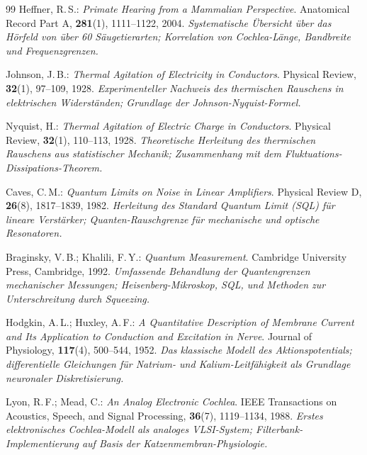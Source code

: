 ﻿\documentclass[12pt,a4paper,titlepage]{report}
\begin{document}
\begin{thebibliography}{99}
Heffner, R.\,S.:
\textit{Primate Hearing from a Mammalian Perspective}.
Anatomical Record Part A, \textbf{281}(1), 1111--1122, 2004.
\newline\textit{Systematische Übersicht über das Hörfeld von über 60
Säugetierarten; Korrelation von Cochlea-Länge, Bandbreite und Frequenzgrenzen.}

Johnson, J.\,B.:
\textit{Thermal Agitation of Electricity in Conductors}.
Physical Review, \textbf{32}(1), 97--109, 1928.
\newline\textit{Experimenteller Nachweis des thermischen Rauschens in elektrischen
Widerständen; Grundlage der Johnson-Nyquist-Formel.}

Nyquist, H.:
\textit{Thermal Agitation of Electric Charge in Conductors}.
Physical Review, \textbf{32}(1), 110--113, 1928.
\newline\textit{Theoretische Herleitung des thermischen Rauschens aus statistischer
Mechanik; Zusammenhang mit dem Fluktuations-Dissipations-Theorem.}

Caves, C.\,M.:
\textit{Quantum Limits on Noise in Linear Amplifiers}.
Physical Review D, \textbf{26}(8), 1817--1839, 1982.
\newline\textit{Herleitung des Standard Quantum Limit (SQL) für lineare Verstärker;
Quanten-Rauschgrenze für mechanische und optische Resonatoren.}

Braginsky, V.\,B.; Khalili, F.\,Y.:
\textit{Quantum Measurement}.
Cambridge University Press, Cambridge, 1992.
\newline\textit{Umfassende Behandlung der Quantengrenzen mechanischer Messungen;
Heisenberg-Mikroskop, SQL, und Methoden zur Unterschreitung durch Squeezing.}

Hodgkin, A.\,L.; Huxley, A.\,F.:
\textit{A Quantitative Description of Membrane Current and Its Application to
Conduction and Excitation in Nerve}.
Journal of Physiology, \textbf{117}(4), 500--544, 1952.
\newline\textit{Das klassische Modell des Aktionspotentials; differentielle
Gleichungen für Natrium- und Kalium-Leitfähigkeit als Grundlage neuronaler
Diskretisierung.}

Lyon, R.\,F.; Mead, C.:
\textit{An Analog Electronic Cochlea}.
IEEE Transactions on Acoustics, Speech, and Signal Processing,
\textbf{36}(7), 1119--1134, 1988.
\newline\textit{Erstes elektronisches Cochlea-Modell als analoges VLSI-System;
Filterbank-Implementierung auf Basis der Katzenmembran-Physiologie.}


\end{thebibliography}
\end{document}
